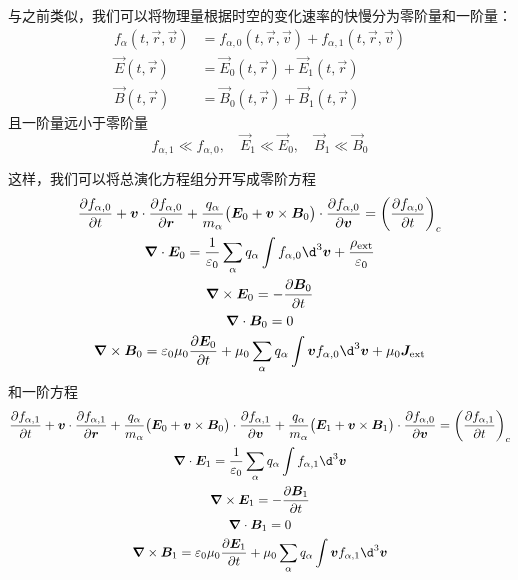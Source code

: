 与之前类似，我们可以将物理量根据时空的变化速率的快慢分为零阶量和一阶量：
\begin{subequations}\begin{align}
f_\alpha(t, \vec{r}, \vec{v}) &= f_{\alpha,0}(t, \vec{r}, \vec{v}) + f_{\alpha,1}(t, \vec{r}, \vec{v}) \\
\vec{E}(t, \vec{r}) &= \vec{E}_0(t, \vec{r}) + \vec{E}_1(t, \vec{r}) \\
\vec{B}(t, \vec{r}) &= \vec{B}_0(t, \vec{r}) + \vec{B}_1(t, \vec{r})
\end{align}\end{subequations}
且一阶量远小于零阶量
\begin{equation}
f_{\alpha,1} \ll f_{\alpha,0}, \quad
\vec{E}_1 \ll \vec{E}_0, \quad
\vec{B}_1 \ll \vec{B}_0
\end{equation}

这样，我们可以将总演化方程组分开写成零阶方程
\begin{subequations}\begin{gather}
\pdv{f_{\alpha,0}}{t}
+ \vec{v} \cdot \pdv{f_{\alpha,0}}{\vec{r}}
+ \frac{q_\alpha}{m_\alpha} \big(
    \vec{E}_0 + \vec{v} \times \vec{B}_0
\big) \cdot \pdv{f_{\alpha,0}}{\vec{v}}
= \left( \pdv{f_{\alpha,0}}{t} \right)_c \\
\dive{\vec{E}_0} = \frac{1}{\varepsilon_0}
\sum_\alpha q_\alpha \int f_{\alpha,0} \d^3 \vec{v}
+ \frac{\rho_{\text{ext}}}{\varepsilon_0} \\
\curl{\vec{E}_0} = - \pdv{\vec{B}_0}{t} \\
\dive{\vec{B}_0} = 0 \\
\curl{\vec{B}_0} = \varepsilon_0 \mu_0 \pdv{\vec{E}_0}{t}
+ \mu_0 \sum_\alpha q_\alpha \int \vec{v} f_{\alpha,0} \d^3 \vec{v}
+ \mu_0 \vec{J}_{\text{ext}}
\end{gather}\end{subequations}
和一阶方程
\begin{subequations}\begin{gather}
\pdv{f_{\alpha,1}}{t}
+ \vec{v} \cdot \pdv{f_{\alpha,1}}{\vec{r}}
+ \frac{q_\alpha}{m_\alpha} \big(
    \vec{E}_0 + \vec{v} \times \vec{B}_0
\big) \cdot \pdv{f_{\alpha,1}}{\vec{v}}
+ \frac{q_\alpha}{m_\alpha} \big(
    \vec{E}_1 + \vec{v} \times \vec{B}_1
\big) \cdot \pdv{f_{\alpha,0}}{\vec{v}}
= \left( \pdv{f_{\alpha,1}}{t} \right)_c \\
\dive{\vec{E}_1} = \frac{1}{\varepsilon_0}
\sum_\alpha q_\alpha \int f_{\alpha,1} \d^3 \vec{v} \\
\curl{\vec{E}_1} = - \pdv{\vec{B}_1}{t} \\
\dive{\vec{B}_1} = 0 \\
\curl{\vec{B}_1} = \varepsilon_0 \mu_0 \pdv{\vec{E}_1}{t}
+ \mu_0 \sum_\alpha q_\alpha \int \vec{v} f_{\alpha,1} \d^3 \vec{v}
\end{gather}\end{subequations}

